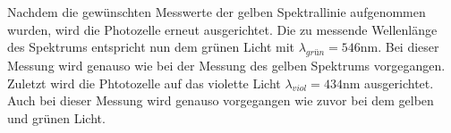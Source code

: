 Nachdem die gewünschten Messwerte der gelben Spektrallinie aufgenommen wurden, wird die Photozelle erneut ausgerichtet.
Die zu messende Wellenlänge des Spektrums entspricht nun dem grünen Licht mit $\lambda_{grün} = 546 \si{\nano\meter}$.
Bei dieser Messung wird genauso wie bei der Messung des gelben Spektrums vorgegangen.
Zuletzt wird die Phtotozelle auf das violette Licht $\lambda_{viol} = 434 \si{\nano\meter}$ ausgerichtet.
Auch bei dieser Messung wird genauso vorgegangen wie zuvor bei dem gelben und grünen Licht.
